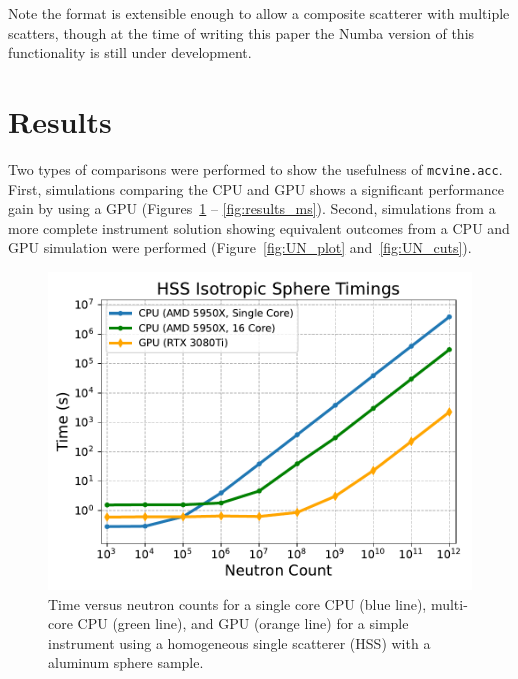 \vspace{1mm}

\vspace{1mm}

Note the format is extensible enough to allow a composite scatterer with multiple scatters, though at the time of writing this paper the Numba version of this functionality is still under development.


\section{Results}

Two types of comparisons were performed to show the usefulness of \texttt{mcvine.acc}. First, simulations comparing the CPU and GPU shows a significant performance gain by using a GPU (Figures~\ref{fig:results_isotropic_sphere} -- \ref{fig:results_ms}).
Second, simulations from a more complete instrument solution showing equivalent outcomes from a CPU and GPU simulation were performed (Figure~\ref{fig:UN_plot} and~\ref{fig:UN_cuts}).

\begin{figure}[h]
    \centering
    \includegraphics[width=\columnwidth]{figures/mcvine_hss_isotropic_timings.pdf}
    \caption{Time versus neutron counts for  a single core CPU (blue line), multi-core CPU (green line), and GPU (orange line) for a simple instrument using a homogeneous single scatterer (HSS) with a aluminum sphere sample.}
    \label{fig:results_isotropic_sphere}
\end{figure}

